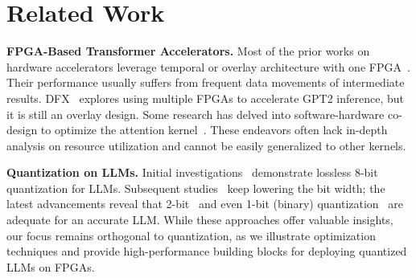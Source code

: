 \section{Related Work}
\label{sec:related_work}
\noindent\textbf{FPGA-Based Transformer Accelerators.}
Most of the prior works on hardware accelerators leverage temporal or overlay architecture with one FPGA~\cite{liu2021fqbert, li2020ftrans, qi2021iccad, hur2023flexrun, khan2021npe,peng2021cbbp,li2021nmta,qi2021bmc}. 
Their performance usually suffers from frequent data movements of intermediate results. 
DFX~\cite{hong2022dfx} explores using multiple FPGAs to accelerate GPT2 inference, but it is still an overlay design.
Some research has delved into software-hardware co-design to optimize the attention kernel~\cite{zhang2021attn_codesign}.
These endeavors often lack in-depth analysis on resource utilization and cannot be easily generalized to other kernels.

\noindent\textbf{Quantization on LLMs.} 
Initial investigations~\cite{xiao2023smoothquant, dettmers2022llmint8, yao2022zeroquant} demonstrate lossless 8-bit quantization for LLMs.
Subsequent studies~\cite{frantar2022gptq, lin2023awq, yao2022zeroquant, yuan2023rptq, kim2023squeezellm, zhao2023atom} keep lowering the bit width;
the latest advancements reveal that 2-bit~\cite{chee2023quip} and even 1-bit (binary) quantization~\cite{zhang2023binarized} are adequate for an accurate LLM.
While these approaches offer valuable insights, our focus remains orthogonal to quantization, as we illustrate optimization techniques and provide high-performance building blocks for deploying quantized LLMs on FPGAs.


